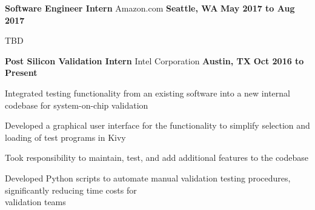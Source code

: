 \begin{cventries}
  \cventry
    {\normalsize \textbf{Software Engineer Intern}}
    {\large Amazon.com}
    {\normalsize \textbf{Seattle, WA}}
    {\normalsize \textbf{May 2017 to Aug 2017}}
    {
      \begin{cvitems}
        \item {\normalsize TBD}
      \end{cvitems}
    }
  \cventry
    {\normalsize \textbf{Post Silicon Validation Intern}}
    {\large Intel Corporation}
    {\normalsize \textbf{Austin, TX}}
    {\normalsize \textbf{Oct 2016 to Present}}
    {
      \begin{cvitems}
        \item {\normalsize Integrated testing functionality from an existing software into a new internal codebase for system-on-chip validation}
        \item {\normalsize Developed a graphical user interface for the functionality to simplify selection and loading of test programs in Kivy}
        \item {\normalsize Took responsibility to maintain, test, and add additional features to the codebase}
        \item {\normalsize Developed Python scripts to automate manual validation testing procedures, significantly reducing time costs for \\validation teams}
      \end{cvitems}
    }
\end{cventries}
